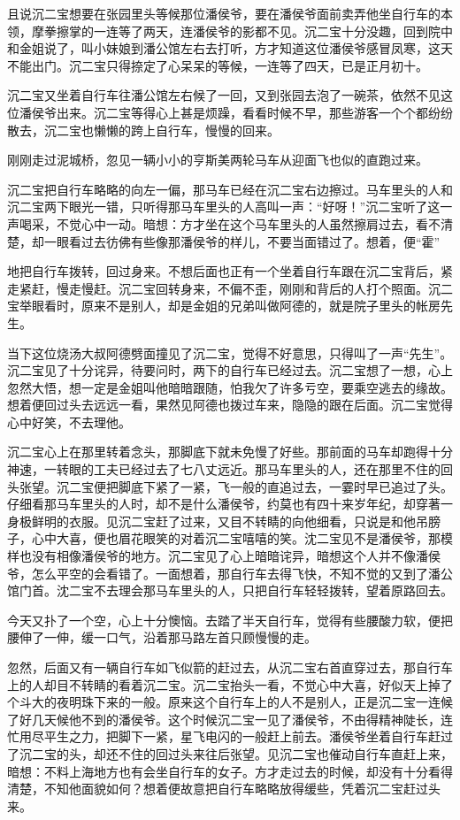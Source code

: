 \documentclass[12pt,UTF8]{ctexbook}
\begin{document}
{{{且说沉二宝想要在张园里头等候那位潘侯爷，要在潘侯爷面前卖弄他坐自行车的本领，摩拳擦掌的一连等了两天，连潘侯爷的影都不见。沉二宝十分没趣，回到院中和金姐说了，叫小妹娘到潘公馆左右去打听，方才知道这位潘侯爷感冒凤寒，这天不能出门。沉二宝只得捺定了心呆呆的等候，一连等了四天，已是正月初十。

沉二宝又坐着自行车往潘公馆左右候了一回，又到张园去泡了一碗茶，依然不见这位潘侯爷出来。沉二宝等得心上甚是烦躁，看看时候不早，那些游客一个个都纷纷散去，沉二宝也懒懒的跨上自行车，慢慢的回来。

刚刚走过泥城桥，忽见一辆小小的亨斯美两轮马车从迎面飞也似的直跑过来。

沉二宝把自行车略略的向左一偏，那马车已经在沉二宝右边擦过。马车里头的人和沉二宝两下眼光一错，只听得那马车里头的人高叫一声：“好呀！”沉二宝听了这一声喝采，不觉心中一动。暗想：方才坐在这个马车里头的人虽然擦肩过去，看不清楚，却一眼看过去彷佛有些像那潘侯爷的样儿，不要当面错过了。想着，便“霍”

地把自行车拨转，回过身来。不想后面也正有一个坐着自行车跟在沉二宝背后，紧走紧赶，慢走慢赶。沉二宝回转身来，不偏不歪，刚刚和背后的人打个照面。沉二宝举眼看时，原来不是别人，却是金姐的兄弟叫做阿德的，就是院子里头的帐房先生。

当下这位烧汤大叔阿德劈面撞见了沉二宝，觉得不好意思，只得叫了一声“先生”。沉二宝见了十分诧异，待要问时，两下的自行车已经过去。沉二宝想了一想，心上忽然大悟，想一定是金姐叫他暗暗跟随，怕我欠了许多亏空，要乘空逃去的缘故。想着便回过头去远远一看，果然见阿德也拨过车来，隐隐的跟在后面。沉二宝觉得心中好笑，不去理他。

沉二宝心上在那里转着念头，那脚底下就未免慢了好些。那前面的马车却跑得十分神速，一转眼的工夫已经过去了七八丈远近。那马车里头的人，还在那里不住的回头张望。沉二宝便把脚底下紧了一紧，飞一般的直追过去，一霎时早已追过了头。仔细看那马车里头的人时，却不是什么潘侯爷，约莫也有四十来岁年纪，却穿著一身极鲜明的衣服。见沉二宝赶了过来，又目不转睛的向他细看，只说是和他吊膀子，心中大喜，便也眉花眼笑的对着沉二宝嘻嘻的笑。沈二宝见不是潘侯爷，那模样也没有相像潘侯爷的地方。沉二宝见了心上暗暗诧异，暗想这个人并不像潘侯爷，怎么平空的会看错了。一面想着，那自行车去得飞快，不知不觉的又到了潘公馆门首。沈二宝不去理会那马车里头的人，只把自行车轻轻拨转，望着原路回去。

今天又扑了一个空，心上十分懊恼。去踏了半天自行车，觉得有些腰酸力软，便把腰伸了一伸，缓一口气，沿着那马路左首只顾慢慢的走。

忽然，后面又有一辆自行车如飞似箭的赶过去，从沉二宝右首直穿过去，那自行车上的人却目不转睛的看着沉二宝。沉二宝抬头一看，不觉心中大喜，好似天上掉了个斗大的夜明珠下来的一般。原来这个自行车上的人不是别人，正是沉二宝一连候了好几天候他不到的潘侯爷。这个时候沉二宝一见了潘侯爷，不由得精神陡长，连忙用尽平生之力，把脚下一紧，星飞电闪的一般赶上前去。潘侯爷坐着自行车赶过了沉二宝的头，却还不住的回过头来往后张望。见沉二宝也催动自行车直赶上来，暗想：不料上海地方也有会坐自行车的女子。方才走过去的时候，却没有十分看得清楚，不知他面貌如何？想着便故意把自行车略略放得缓些，凭着沉二宝赶过头来。

}}}
\end{document}
